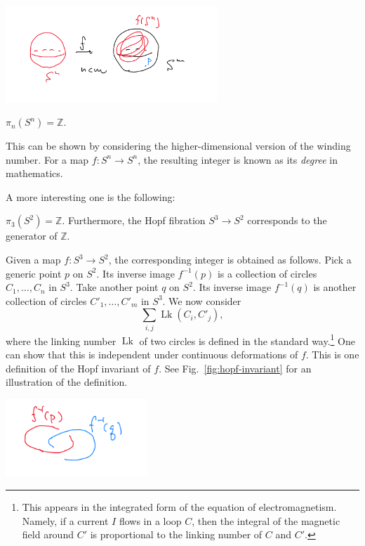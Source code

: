 \documentclass[12pt]{article}
\numberwithin{equation}{section}
\theoremstyle{remark}
\renewenvironment{figure}[1][]{
  \begin{originalfigure}[#1]
    \begin{mdframed}[linecolor=black!0,backgroundcolor=black!1]
}{
    \end{mdframed}
  \end{originalfigure}
}
\def\bZ{\mathbb{Z}}
\def\Lk{\mathop{\mathrm{Lk}}}
\begin{document}
\begin{figure}
  \centering
  \includegraphics[width=0.6\textwidth]{nm}
  \caption{A generic map $S^n\to S^m$ with $n<m$ has a point $p\in S^m$ not mapped from $S^n$.}
  \label{fig:nm}
\end{figure}


\begin{theorem}
$\pi_n(S^n) =\bZ$.
\end{theorem}
This can be shown by considering 
the higher-dimensional version of the winding number.
For a map $f:S^n\to S^n$, 
the resulting integer is known as its \emph{degree} in mathematics.

A more interesting one is the following:
\begin{theorem}
  $\pi_3(S^2)=\bZ$. 
  Furthermore, the Hopf fibration $S^3\to S^2$ corresponds 
  to the generator of $\bZ$.
\end{theorem}



Given a map $f:S^3\to S^2$, the corresponding integer is obtained as follows.
Pick a generic point $p$ on $S^2$. 
Its inverse image $f^{-1}(p)$ is a collection of circles $C_1,\ldots, C_n$ in $S^3$.
Take another point $q$ on $S^2$.
Its inverse image $f^{-1}(q)$ is another collection of circles $C'_1,\ldots, C'_m$ in $S^3$.
We now consider \begin{equation}
\sum_{i,j} \Lk(C_i,C'_j), \label{eq:Hopf-invariant-crude}
\end{equation}
where the linking number $\Lk$ of two circles is defined in the standard way.\footnote{This appears in the integrated form of the equation of electromagnetism.
Namely, if a current $I$ flows in a loop $C$,
then the integral of the magnetic field around $C'$ 
is proportional to the linking number of $C$ and $C'$.}
One can show that this is independent under continuous deformations of $f$.
This is one definition of the Hopf invariant of $f$.
See Fig.~\ref{fig:hopf-invariant} for an illustration of the definition.

\begin{figure}
  \centering
  \includegraphics[width=0.4\textwidth]{hopf}
  \caption{A definition of the Hopf invariant of a map $f:S^3\to S^2$  is 
  given by considering the linking number of the inverse images of two points in $S^2$.}
  \label{fig:hopf-invariant}
\end{figure}
\end{document}
